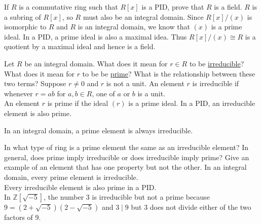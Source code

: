 \documentclass[avery5371,grid]{flashcards}
\newcommand{\Z}{\mathbb{Z}}
\begin{document}
\begin{flashcard}[Rings]{If $R$ is a commutative ring such that $R[x]$ is a PID, prove that $R$ is a field.}
 $R$ is a subring of $R[x]$, so $R$ must also be an integral domain. Since $R[x]/(x)$ is isomorphic to $R$ and $R$ is an integral domain, we know that $(x)$ is a prime ideal. In a PID, a prime ideal is also a maximal idea. Thus $R[x]/(x) \cong R$ is a quotient by a maximal ideal and hence is a field.
\end{flashcard}


\begin{flashcard}[Rings]{Let $R$ be an integral domain. What does it mean for $r \in R$ to be \underline{irreducible}? What does it mean for $r$ to be be \underline{prime}? What is the relationship between these two terms?}
 Suppose $r \neq 0$ and $r$ is not a unit. An element $r$ is irreducible if whenever $r = ab$ for $a,b \in R$, one of $a$ or $b$ is a unit.\\
 
 An element $r$ is prime if the ideal $(r)$ is a prime ideal. In a PID, an irreducible element is also prime.
 
 In an integral domain, a prime element is always irreducible.
\end{flashcard}

\begin{flashcard}[Rings]{In what type of ring is a prime element the same as an irreducible element? In general, does prime imply irreducible or does irreducible imply prime? Give an example of an element that has one property but not the other.}
 In an integral domain, every prime element is irreducible.\\
 
 Every irreducible element is also prime in a PID.\\
 
 In $\Z[\sqrt{-5}]$, the number 3 is irreducible but not a prime because $9 = (2 + \sqrt{-5})(2 - \sqrt{-5})$ and $3 \mid 9$ but $3$ does not divide either of the two factors of 9.
\end{flashcard}
\end{document}

